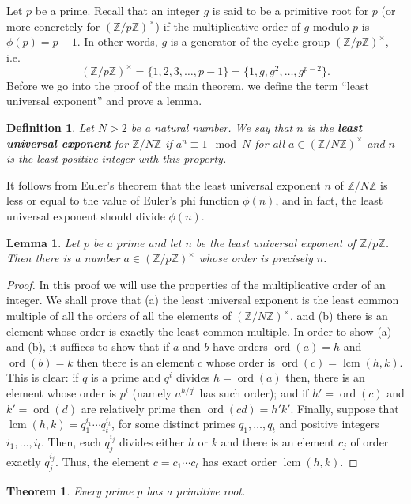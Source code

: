 \documentclass[12pt]{article}
\newtheorem*{thm}{Theorem}
\newtheorem*{defn}{Definition}
\newtheorem*{lemma}{Lemma}
\theoremstyle{definition}
\newcommand{\Ints}{\mathbb{Z}}
\newcommand{\ord}{\operatorname{ord}}
\newcommand{\lcm}{\operatorname{lcm}}
\begin{document}
  Let $p$ be a prime. Recall that an integer $g$ is said to be a primitive root for $p$ (or more concretely for $(\Ints/p\Ints)^\times$) if the multiplicative order of $g$ modulo $p$ is $\phi(p)=p-1$. In other words, $g$ is a generator of the cyclic group $(\Ints/p\Ints)^\times$, i.e.
$$(\Ints/p\Ints)^\times =\{1,2,3,\ldots,p-1\}= \{ 1, g, g^2,\ldots,g^{p-2}\}.$$
Before we go into the proof of the main theorem, we define the term ``least universal exponent'' and prove a lemma.
\begin{defn}
Let $N>2$ be a natural number. We say that $n$ is the {\bf least universal exponent} for $\Ints/N\Ints$ if $a^n\equiv 1\mod N$ for all $a\in (\Ints/N\Ints)^\times$ and $n$ is the least positive integer with this property.  
\end{defn}
It follows from Euler's theorem that the least universal exponent $n$ of $\Ints/N\Ints$ is less or equal to the value of Euler's phi function $\phi(n)$, and in fact, the least universal exponent should divide $\phi(n)$.  
\begin{lemma}
Let $p$ be a prime and let $n$ be the least universal exponent of $\Ints/p\Ints$. Then there is a number $a\in (\Ints/p\Ints)^\times$ whose order is precisely $n$.
\end{lemma}
\begin{proof} In this proof we will use the properties of the multiplicative order of an integer. We shall prove that (a) the least universal exponent is the least common multiple of all the orders of all the elements of $(\Ints/N\Ints)^\times$, and (b) there is an element whose order is exactly the least common multiple. In order to show (a) and (b), it suffices to show that if $a$ and $b$ have orders $\ord(a)=h$ and $\ord(b)=k$ then there is an element $c$ whose order is $\ord(c)=\lcm(h,k)$. This is clear: if $q$ is a prime and $q^i$ divides $h=\ord(a)$ then, there is an element whose order is $p^i$ (namely $a^{h/q^i}$ has such order); and if $h'=\ord(c)$ and $k'=\ord(d)$ are relatively prime then $\ord(cd)=h'k'$. Finally, suppose that $\lcm(h,k)=q_1^{i_1}\cdots q_t^{i_t}$, for some distinct primes $q_1,\ldots, q_t$ and positive integers $i_1,\ldots,i_t$. Then, each $q_j^{i_j}$ divides either $h$ or $k$ and there is an element $c_j$ of order exactly $q_j^{i_j}$. Thus, the element $c=c_1\cdots c_t$ has exact order $\lcm(h,k)$.
\end{proof}

\begin{thm}
Every prime $p$ has a primitive root.
\end{thm}
\end{document}
